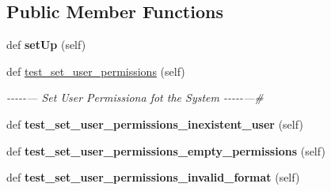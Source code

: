 \subsection*{Public Member Functions}
\begin{DoxyCompactItemize}
\item 
\mbox{\label{classtests_1_1test__10__user__set__permissions_1_1_test_user_routes_a5773b06b2efffe868df74479c392e383}} 
def {\bfseries set\+Up} (self)
\item 
\mbox{\label{classtests_1_1test__10__user__set__permissions_1_1_test_user_routes_aa7374ec2b281be86b8813d849bca2ee1}} 
def \hyperlink{classtests_1_1test__10__user__set__permissions_1_1_test_user_routes_aa7374ec2b281be86b8813d849bca2ee1}{test\+\_\+set\+\_\+user\+\_\+permissions} (self)
\begin{DoxyCompactList}\small\item\em -\/-\/-\/-\/-\/--- Set User Permissiona fot the System -\/-\/-\/-\/-\/---\# \end{DoxyCompactList}\item 
\mbox{\label{classtests_1_1test__10__user__set__permissions_1_1_test_user_routes_a63b564027181682571313331b1f0f42b}} 
def {\bfseries test\+\_\+set\+\_\+user\+\_\+permissions\+\_\+inexistent\+\_\+user} (self)
\item 
\mbox{\label{classtests_1_1test__10__user__set__permissions_1_1_test_user_routes_a01d7331e15df9f31f5678d4cd3b88ebf}} 
def {\bfseries test\+\_\+set\+\_\+user\+\_\+permissions\+\_\+empty\+\_\+permissions} (self)
\item 
\mbox{\label{classtests_1_1test__10__user__set__permissions_1_1_test_user_routes_a9fccb7d908130092c5892f7faa71ce82}} 
def {\bfseries test\+\_\+set\+\_\+user\+\_\+permissions\+\_\+invalid\+\_\+format} (self)
\end{DoxyCompactItemize}
